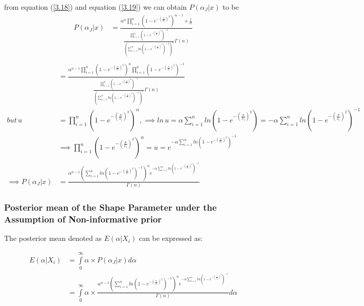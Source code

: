 \documentclass[a4paper,12pt]{report}
\begin{document}
from equation (\ref{3.18}) and equation (\ref{3.19}) we can obtain $P(\alpha_J|x)$ to be 
\begin{equation}
\begin{split}
P(\alpha_J|x)&= \frac{\alpha^n \prod\limits_{ i=1 }^{n}\left(1-e^{-\left(\frac{\sigma}{x_i}\right)^2}\right)^{\alpha-1}\times \frac{1}{\alpha}}{\frac{\prod\limits_{ i=1 }^{n}\left(1-e^{-\left(\frac{\sigma}{x_i}\right)^2}\right)^{-1}}{\left(\sum\limits_{ i=1 }^{n}ln\left(1-e^{-\left(\frac{\sigma}{x_i}\right)^2}\right)^{-1}\right)^n}\Gamma(n)}\\
\end{split}
\end{equation}
\begin{equation}\label{3.20}
\begin{split}
&= \frac{\alpha^{n-1} \prod\limits_{ i=1 }^{n}\left(1-e^{-\left(\frac{\sigma}{x_i}\right)^2}\right)^{\alpha}\prod\limits_{ i=1 }^{n}\left(1-e^{-\left(\frac{\sigma}{x_i}\right)^2}\right)^{-1}}{\frac{\prod\limits_{ i=1 }^{n}\left(1-e^{-\left(\frac{\sigma}{x_i}\right)^2}\right)^{-1}}{\left(\sum\limits_{ i=1 }^{n}ln\left(1-e^{-\left(\frac{\sigma}{x_i}\right)^2}\right)^{-1}\right)^n}\Gamma(n)}\\
but \, u&=\prod\limits_{ i=1 }^{n}\left(1-e^{-\left(\frac{\sigma}{x_i}\right)^2}\right)^{\alpha},\implies ln\,u=\alpha\sum\limits_{ i=1 }^{n}ln\left(1-e^{-\left(\frac{\sigma}{x_i}\right)^2}\right)=-\alpha\sum\limits_{ i=1 }^{n}ln\left(1-e^{-\left(\frac{\sigma}{x_i}\right)^2}\right)^{-1}\\
&\implies \prod\limits_{ i=1 }^{n}\left(1-e^{-\left(\frac{\sigma}{x_i}\right)^2}\right)^{\alpha}=u=e^{-\alpha\sum\limits_{ i=1 }^{n}ln\left(1-e^{-\left(\frac{\sigma}{x_i}\right)^2}\right)^{-1}}\\
\implies P(\alpha_J|x)&=\frac{\alpha^{n-1}\left(\sum\limits_{ i=1 }^{n}ln\left(1-e^{-\left(\frac{\sigma}{x_i}\right)^2}\right)^{-1}\right)^n e^{-\alpha\sum\limits_{ i=1 }^{n}ln\left(1-e^{-\left(\frac{\sigma}{x_i}\right)^2}\right)^{-1}}}{\Gamma(n)}
\end{split} 	
\end{equation}

\subsubsection{Posterior mean of the Shape Parameter under the Assumption of Non-informative prior}
The posterior mean denoted as $E(\alpha|X_i)$ can be expressed as:


\[\begin{split}
E(\alpha|X_i)&=\int\limits_{0}^{\infty}\alpha \times P(\alpha_J|x)d\alpha\\
&=\int\limits_{0}^{\infty}\alpha \times \frac{\alpha^{n-1}\left(\sum\limits_{ i=1 }^{n}ln\left(1-e^{-\left(\frac{\sigma}{x_i}\right)^2}\right)^{-1}\right)^n e^{-\alpha\sum\limits_{ i=1 }^{n}ln\left(1-e^{-\left(\frac{\sigma}{x_i}\right)^2}\right)^{-1}}}{\Gamma(n)} d\alpha\\
\end{split} \]
\end{document}
